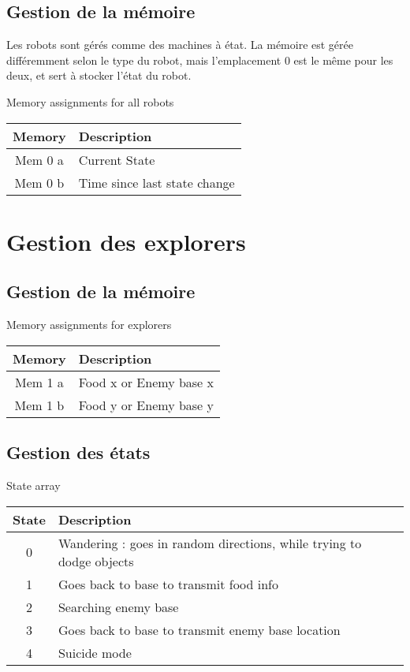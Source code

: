 \documentclass{article}
\begin{document}
\subsection{Gestion de la mémoire}

Les robots sont gérés comme des machines à état.
La mémoire est gérée différemment selon le type du robot, mais l'emplacement 0 est le même pour les deux, et sert à stocker l'état du robot.

\begin{table}[ht]
	Memory assignments for all robots\\
	\begin{tabular}{|c|l|}
		\hline
		Memory & Description\\
		\hline
		Mem 0 a & Current State\\
		Mem 0 b & Time since last state change\\
		\hline
	\end{tabular}
\end{table}

\section{Gestion des explorers}

\subsection{Gestion de la mémoire}

\begin{table}[ht]
	Memory assignments for explorers\\
	\begin{tabular}{|c|l|}
		\hline
		Memory & Description\\
		\hline
		Mem 1 a & Food x or Enemy base x\\
		Mem 1 b & Food y or Enemy base y\\
		\hline
	\end{tabular}
\end{table}

\subsection{Gestion des états}

\begin{table}[ht]
	State array\\
	\begin{tabular}{|c|l|}
		\hline
		State & Description \\
		\hline
		0 & Wandering : goes in random directions, while trying to dodge objects\\
		\hline
		1 & Goes back to base to transmit food info\\
		\hline
		2 & Searching enemy base\\
		\hline
		3 & Goes back to base to transmit enemy base location\\
		\hline
		4 & Suicide mode\\
		\hline
	\end{tabular}
\end{table}
\end{document}
